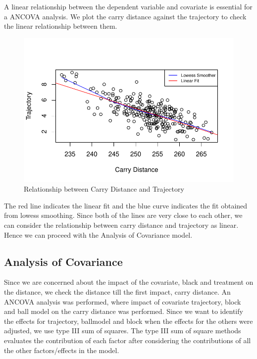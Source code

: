 \documentclass{article}\usepackage[]{graphicx}\usepackage[]{color}
\makeatletter
\def\maxwidth{ %
  \ifdim\Gin@nat@width>\linewidth
    \linewidth
  \else
    \Gin@nat@width
  \fi
}
\newenvironment{knitrout}{}{} %
\makeatother
\begin{document}
A linear relationship between the dependent variable and covariate is essential for a ANCOVA analysis. We plot the carry distance against the trajectory to check the linear relationship between them.

\begin{figure}[ht]
\centering
\begin{knitrout}
\color{fgcolor}
\includegraphics[width=\maxwidth]{figure/linearity_of_variables-1} 

\end{knitrout}
\caption{Relationship between Carry Distance and Trajectory}
\label{Relationship between covariate and Response}
\end{figure}
The red line indicates the linear fit and the blue curve indicates the fit obtained from lowess smoothing. Since both of the lines are very close to each other, we can consider the relationship between carry distance and trajectory as linear. Hence we can proceed with the Analysis of Covariance model.


\subsection*{Analysis of Covariance}

Since we are concerned about the impact of the covariate, black and treatment on the distance, we check the distance till the first impact, carry distance. An ANCOVA analysis was performed, where impact of covariate trajectory, block and ball model on the carry distance was performed. Since we want to identify the effects for trajectory, ballmodel and block when the effects for the others were adjusted, we use type III sum of squares. The type III sum of square methods evaluates the contribution of each factor after considering the contributions of all the other factors/effects in the model.
\end{document}
